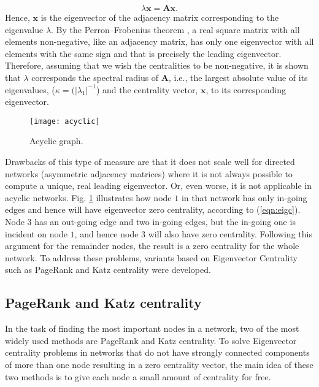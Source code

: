 \begin{equation}
    \lambda \mathbf{x} = \mathbf{A}\mathbf{x}.
\end{equation}
Hence, $\mathbf{x}$ is the eigenvector of the adjacency matrix corresponding to the eigenvalue $\lambda$. By the Perron–Frobenius theorem \cite[Ch.\ 8]{meyer2000matrix}, a real square matrix with all elements non-negative, like an adjacency matrix, has only one eigenvector with all elements with the same sign and that is precisely the leading eigenvector. Therefore, assuming that we wish the centralities to be non-negative, it is shown that $\lambda$ corresponds the spectral radius of $\mathbf{A}$, i.e., the largest absolute value of its eigenvalues, ($\kappa=(\lvert \lambda_1 \rvert^{-1}$) and the centrality vector, $\mathbf{x}$, to its corresponding eigenvector.

\begin{figure}[h]\centering
	\texttt{[image: acyclic]}
	\caption{Acyclic graph.}
	\label{fig:acyclic}
	\bigskip
\end{figure}

Drawbacks of this type of measure are that it does not scale well for directed networks (asymmetric adjacency matrices) where it is not always possible to compute a unique, real leading eigenvector. Or, even worse, it is not applicable in acyclic networks. Fig. \ref{fig:acyclic} illustrates how node $1$ in that network has only in-going edges and hence will have eigenvector zero centrality, according to (\ref{eqn:eigc}). Node $3$ has an out-going edge and two in-going edges, but the in-going one is incident on node $1$, and hence node $3$ will also have zero centrality. Following this argument for the remainder nodes, the result is a zero centrality for the whole network. To address these problems, variants based on Eigenvector Centrality such as PageRank and Katz centrality were developed.

\subsection*{PageRank and Katz centrality}
In the task of finding the most important nodes in a network, two of the most widely used methods are PageRank and Katz centrality. To solve Eigenvector centrality problems in networks that do not have strongly connected components of more than one node resulting in a zero centrality vector, the main idea of these two methods is to give each node a small amount of centrality for free. 

